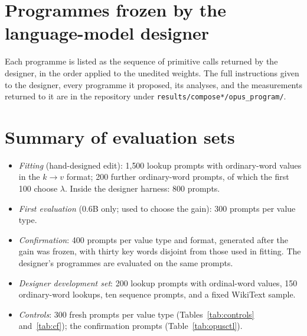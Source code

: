 \documentclass[11pt]{article}
\begin{document}
\section{Programmes frozen by the language-model designer}\label{app:programmes}

Each programme is listed as the sequence of primitive calls returned by the designer, in the order applied to the unedited weights. The full instructions given to the designer, every programme it proposed, its analyses, and the measurements returned to it are in the repository under \texttt{results/compose*/opus\_program/}.



\section{Summary of evaluation sets}

\begin{itemize}
\item \emph{Fitting} (hand-designed edit): 1{,}500 lookup prompts with ordinary-word values in the $k \rightarrow v$ format; 200 further ordinary-word prompts, of which the first 100 choose $\lambda$. Inside the designer harness: 800 prompts.
\item \emph{First evaluation} (0.6B only; used to choose the gain): 300 prompts per value type.
\item \emph{Confirmation}: 400 prompts per value type and format, generated after the gain was frozen, with thirty key words disjoint from those used in fitting. The designer's programmes are evaluated on the same prompts.
\item \emph{Designer development set}: 200 lookup prompts with ordinal-word values, 150 ordinary-word lookups, ten sequence prompts, and a fixed WikiText sample.
\item \emph{Controls}: 300 fresh prompts per value type (Tables~\ref{tab:controls} and~\ref{tab:cf}); the confirmation prompts (Table~\ref{tab:opusctl}).
\end{itemize}
\end{document}
